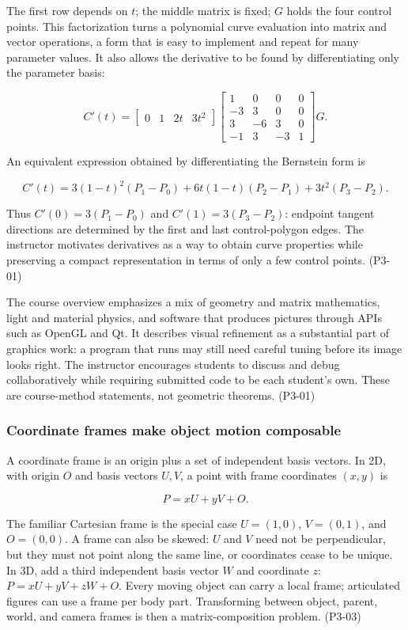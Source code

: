 The first row depends on \(t\); the middle matrix is fixed; \(G\) holds the four control points. This factorization turns a polynomial curve evaluation into matrix and vector operations, a form that is easy to implement and repeat for many parameter values. It also allows the derivative to be found by differentiating only the parameter basis:

\[
C'(t)=\begin{bmatrix}0&1&2t&3t^2\end{bmatrix}
\begin{bmatrix}1&0&0&0\\-3&3&0&0\\3&-6&3&0\\-1&3&-3&1\end{bmatrix}G.
\]

An equivalent expression obtained by differentiating the Bernstein form is

\[
C'(t)=3(1-t)^2(P_1-P_0)+6t(1-t)(P_2-P_1)+3t^2(P_3-P_2).
\]

Thus \(C'(0)=3(P_1-P_0)\) and \(C'(1)=3(P_3-P_2)\): endpoint tangent directions are determined by the first and last control-polygon edges. The instructor motivates derivatives as a way to obtain curve properties while preserving a compact representation in terms of only a few control points. (P3-01)

The course overview emphasizes a mix of geometry and matrix mathematics, light and material physics, and software that produces pictures through APIs such as OpenGL and Qt. It describes visual refinement as a substantial part of graphics work: a program that runs may still need careful tuning before its image looks right. The instructor encourages students to discuss and debug collaboratively while requiring submitted code to be each student's own. These are course-method statements, not geometric theorems. (P3-01)

\subsubsection{Coordinate frames make object motion composable}\label{03-visual-computing-i-ch001-coordinate-frames-make-object-motion-composable}

A coordinate frame is an origin plus a set of independent basis vectors. In 2D, with origin \(O\) and basis vectors \(U,V\), a point with frame coordinates \((x,y)\) is

\[
P=xU+yV+O.
\]

The familiar Cartesian frame is the special case \(U=(1,0)\), \(V=(0,1)\), and \(O=(0,0)\). A frame can also be skewed: \(U\) and \(V\) need not be perpendicular, but they must not point along the same line, or coordinates cease to be unique. In 3D, add a third independent basis vector \(W\) and coordinate \(z\): \(P=xU+yV+zW+O\). Every moving object can carry a local frame; articulated figures can use a frame per body part. Transforming between object, parent, world, and camera frames is then a matrix-composition problem. (P3-03)

